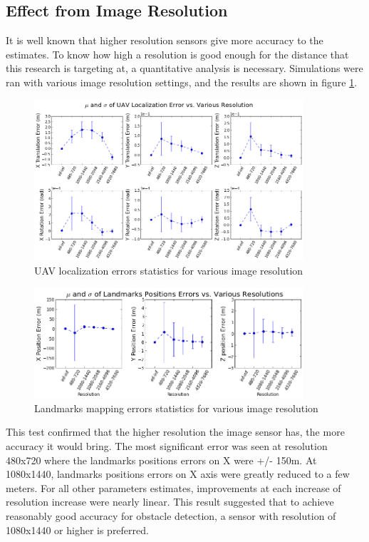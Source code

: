\subsection{Effect from Image Resolution}

It is well known that higher resolution sensors give more accuracy
to the estimates. To know how high a resolution is good enough for the
distance that this research is targeting at, a quantitative
analysis is necessary. Simulations were ran with various image
resolution settings, and the results are shown in figure
\ref{fig:simfig50}.
\begin{figure}[h] 
  \centering
  \includegraphics[width=10cm,keepaspectratio=true]{./Figures/SimulationFigures/Figure50.png}
  \caption{UAV localization errors statistics for various image resolution}
  \label{fig:simfig50}
\end{figure}

\begin{figure}[h] %
  \centering
  \includegraphics[width=10cm,keepaspectratio=true]{./Figures/SimulationFigures/Figure49.png}
  \caption{Landmarks mapping errors statistics for various image resolution}
  \label{fig:simfig51}
\end{figure}

This test confirmed that the higher resolution the image sensor has,
the more accuracy it would bring. The most significant error was seen
at resolution 480x720 where the landmarks positions errors on X were
+/- 150m. At 1080x1440, landmarks positions errors on X axis were
greatly reduced to a few meters. For all other parameters estimates,
improvements at each increase of resolution increase were nearly linear.
This result suggested that to achieve reasonably good accuracy for
obstacle detection, a sensor with resolution of 1080x1440 or higher is
preferred.



